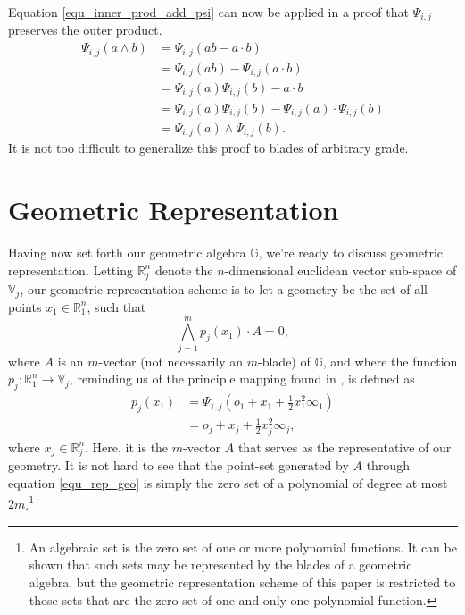 \documentclass{ecgd-l}
\theoremstyle{definition}
\theoremstyle{remark}
\numberwithin{equation}{section}
\newcommand{\G}{\mathbb{G}}
\newcommand{\V}{\mathbb{V}}
\newcommand{\R}{\mathbb{R}}
\newcommand{\nvai}{\infty}
\newcommand{\nvao}{o}
\begin{document}
Equation \eqref{equ_inner_prod_add_psi} can now be applied in a proof
that $\Psi_{i,j}$ preserves the outer product.
\begin{align*}
\Psi_{i,j}(a\wedge b) &= \Psi_{i,j}(ab - a\cdot b) \\
 &= \Psi_{i,j}(ab) - \Psi_{i,j}(a\cdot b) \\
 &= \Psi_{i,j}(a)\Psi_{i,j}(b) - a\cdot b \\
 &= \Psi_{i,j}(a)\Psi_{i,j}(b) - \Psi_{i,j}(a)\cdot\Psi_{i,j}(b) \\
 &= \Psi_{i,j}(a)\wedge\Psi_{i,j}(b).
\end{align*}
It is not too difficult to generalize this proof to blades of arbitrary grade.

\section{Geometric Representation}

Having now set forth our geometric algebra $\G$, we're ready to discuss
geometric representation.
Letting $\R^n_j$ denote the $n$-dimensional euclidean vector sub-space
of $\V_j$, our geometric representation scheme is to let a geometry be the
set of all points $x_1\in\R^n_1$, such that
\begin{equation}\label{equ_rep_geo}
\bigwedge_{j=1}^m p_j(x_1)\cdot A=0,
\end{equation}
where $A$ is an $m$-vector (not necessarily an $m$-blade) of $\G$, and
where the function $p_j:\R^n_1\to\V_j$, reminding us of the principle  mapping found in \cite{Hestenes01}, is defined as
\begin{align*}
p_j(x_1)&=\Psi_{1,j}\left(\nvao_1+x_1+\frac{1}{2}x_1^2\nvai_1\right) \\
 &= \nvao_j + x_j + \frac{1}{2}x_j^2\nvai_j,
\end{align*}
where $x_j\in\R^n_j$.
Here, it is the $m$-vector $A$ that serves as the representative of our geometry.
It is not hard to see that the point-set generated by $A$ through equation \eqref{equ_rep_geo}
is simply the zero set of a polynomial of degree at most $2m$.\footnote{An algebraic
set is the zero set of one or more polynomial functions.  It can be shown that such sets may be represented by
the blades of a geometric algebra, but the geometric representation scheme of this paper is restricted to those sets
that are the zero set of one and only one polynomial function.}
\end{document}
